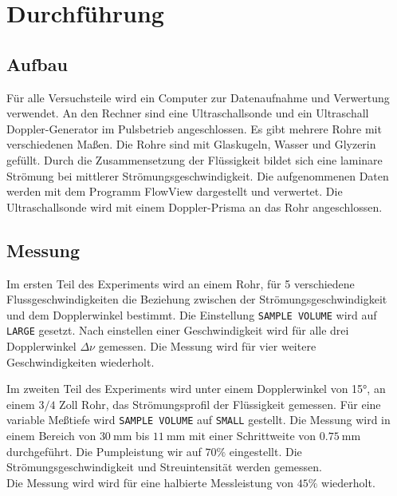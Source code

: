 \section{Durchführung}
\label{sec:Durchführung}

\subsection{Aufbau}

Für alle Versuchsteile wird ein Computer zur Datenaufnahme und Verwertung verwendet.
An den Rechner sind eine Ultraschallsonde und ein Ultraschall Doppler-Generator im Pulsbetrieb angeschlossen.
Es gibt mehrere Rohre mit verschiedenen Maßen. Die Rohre sind mit Glaskugeln, Wasser und Glyzerin gefüllt.
Durch die Zusammensetzung der Flüssigkeit bildet sich eine laminare Strömung bei mittlerer Strömungsgeschwindigkeit.
Die aufgenommenen Daten werden mit dem Programm FlowView dargestellt und verwertet. 
Die Ultraschallsonde wird mit einem Doppler-Prisma an das Rohr angeschlossen.

\subsection{Messung}

Im ersten Teil des Experiments wird an einem Rohr, für 5 verschiedene Flussgeschwindigkeiten die Beziehung zwischen 
der Strömungsgeschwindigkeit und dem Dopplerwinkel bestimmt. Die Einstellung \texttt{SAMPLE VOLUME} wird auf \texttt{LARGE} gesetzt.
Nach einstellen einer Geschwindigkeit wird für alle drei Dopplerwinkel $Δν$ gemessen. Die Messung wird für vier weitere Geschwindigkeiten wiederholt.

Im zweiten Teil des Experiments wird unter einem Dopplerwinkel von 15°, an einem $3/4$ Zoll Rohr, das Strömungsprofil der 
Flüssigkeit gemessen. Für eine variable Meßtiefe wird \texttt{SAMPLE VOLUME} auf \texttt{SMALL} gestellt.
Die Messung wird in einem Bereich von $\SI{30}{\m\m}$ bis $\SI{11}{\m\m}$ %
mit einer Schrittweite von $\SI{0.75}{\m\m}$ durchgeführt. Die Pumpleistung wir auf $70\%$ eingestellt.
Die Strömungsgeschwindigkeit und Streuintensität werden gemessen.\\
Die Messung wird wird für eine halbierte Messleistung von $45\%$ wiederholt.\\